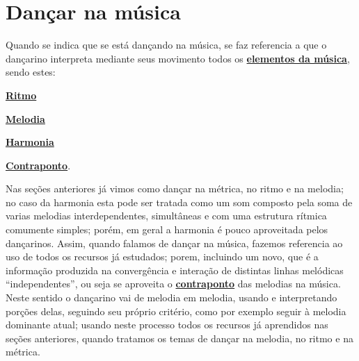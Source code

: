 
\newpage
\section{Dançar na música}
\label{subsec:dancamusica}
Quando se indica que se está dançando na música, se faz referencia a que 
o dançarino interpreta mediante seus movimento todos os 
\hyperref[sec:elementosmusica]{\textbf{elementos da música}}, 
sendo estes:
\begin{inparaitem}
\item \hyperref[sec:pos:Ritmo]{\textbf{Ritmo}}
\item \hyperref[sec:pos:Melodia]{\textbf{Melodia}}
\item \hyperref[sec:pos:Harmonia]{\textbf{Harmonia}}
\item \hyperref[sec:pos:Contraponto]{\textbf{Contraponto}}.
\end{inparaitem}

Nas seções anteriores já vimos como dançar na métrica, no ritmo e na melodia;
no caso da harmonia esta pode ser tratada como um som composto 
pela soma de varias melodias interdependentes, simultâneas e com uma estrutura rítmica
comumente simples; porém, em geral a harmonia é pouco aproveitada pelos dançarinos.   
Assim, quando falamos de  dançar na música, fazemos referencia ao uso de todos os recursos já estudados;
porem, incluindo um novo, 
que é a informação produzida na convergência e interação de distintas linhas melódicas ``independentes'',
 ou seja se aproveita o 
\hyperref[sec:pos:Contraponto]{\textbf{contraponto}} das melodias na música. 
Neste sentido o dançarino vai de melodia em melodia, 
usando e interpretando porções delas, seguindo seu próprio critério,
como por exemplo seguir à melodia dominante atual;
usando neste processo todos os recursos já aprendidos nas seções anteriores, 
quando tratamos os temas de dançar 
na melodia, no ritmo e na métrica.

